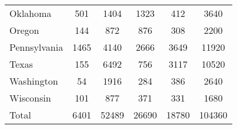 \begin{tabular}{l*{5}{c}}
Oklahoma    &         501&        1404&        1323&         412&        3640\\
Oregon      &         144&         872&         876&         308&        2200\\
Pennsylvania&        1465&        4140&        2666&        3649&       11920\\
Texas       &         155&        6492&         756&        3117&       10520\\
Washington  &          54&        1916&         284&         386&        2640\\
Wisconsin   &         101&         877&         371&         331&        1680\\
Total       &        6401&       52489&       26690&       18780&      104360\\
\bottomrule
\end{tabular}

